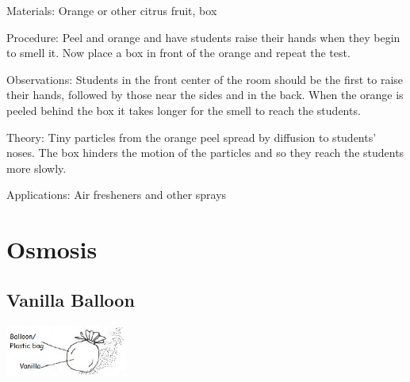 \begin{multicols}{2}
\begin{description*}
\item[Materials:]{Orange or other citrus fruit, box}
\item[Procedure:]{Peel and orange and have students raise their hands when they begin to smell it. Now place a box in front of the orange and repeat the test.}
\item[Observations:]{Students in the front center of the room should be the first to raise their hands, followed by those near the sides and in the back. When the orange is peeled behind the box it takes longer for the smell to reach the students.}
\item[Theory:]{Tiny particles from the orange peel spread by diffusion to students' noses. The box hinders the motion of the particles and so they reach the students more slowly.}
\item[Applications:]{Air fresheners and other sprays}
\end{description*}


\section*{Osmosis}


\subsection{Vanilla Balloon}

\begin{center}
\includegraphics[width=0.3\textwidth]{./img/vso/osmosis-vanilla.jpg}
\end{center}


\end{multicols}
